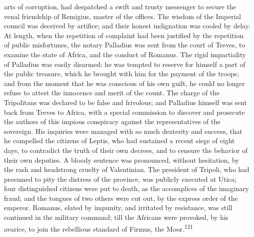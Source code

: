 arts of corruption, had despatched a swift and trusty messenger
to secure the venal friendship of Remigius, master of the
offices. The wisdom of the Imperial council was deceived by
artifice; and their honest indignation was cooled by delay. At
length, when the repetition of complaint had been justified by
the repetition of public misfortunes, the notary Palladius was
sent from the court of Treves, to examine the state of Africa,
and the conduct of Romanus. The rigid impartiality of Palladius
was easily disarmed: he was tempted to reserve for himself a part
of the public treasure, which he brought with him for the payment
of the troops; and from the moment that he was conscious of his
own guilt, he could no longer refuse to attest the innocence and
merit of the count. The charge of the Tripolitans was declared to
be false and frivolous; and Palladius himself was sent back from
Treves to Africa, with a special commission to discover and
prosecute the authors of this impious conspiracy against the
representatives of the sovereign. His inquiries were managed with
so much dexterity and success, that he compelled the citizens of
Leptis, who had sustained a recent siege of eight days, to
contradict the truth of their own decrees, and to censure the
behavior of their own deputies. A bloody sentence was pronounced,
without hesitation, by the rash and headstrong cruelty of
Valentinian. The president of Tripoli, who had presumed to pity
the distress of the province, was publicly executed at Utica;
four distinguished citizens were put to death, as the accomplices
of the imaginary fraud; and the tongues of two others were cut
out, by the express order of the emperor. Romanus, elated by
impunity, and irritated by resistance, was still continued in the
military command; till the Africans were provoked, by his
avarice, to join the rebellious standard of Firmus, the Moor.\textsuperscript{121}




